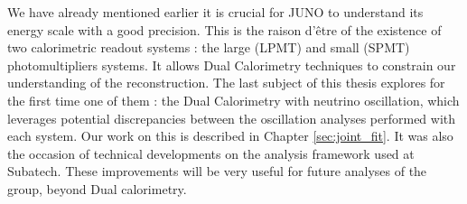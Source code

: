 \hfill

We have already mentioned earlier it is crucial for JUNO to understand its energy scale with a good precision. This is the raison d'être of the existence of two calorimetric readout systems : the large (LPMT) and small (SPMT) photomultipliers systems.
It allows Dual Calorimetry techniques to constrain our understanding of the reconstruction. The last subject of this thesis explores for the first time one of them : the Dual Calorimetry with neutrino oscillation,
which leverages potential discrepancies between the oscillation analyses performed with each system.
Our work on this is described in Chapter \ref{sec:joint_fit}.
It was also the occasion of technical developments on the analysis framework used at Subatech. These improvements will be very useful for future analyses of the group, beyond Dual calorimetry.
